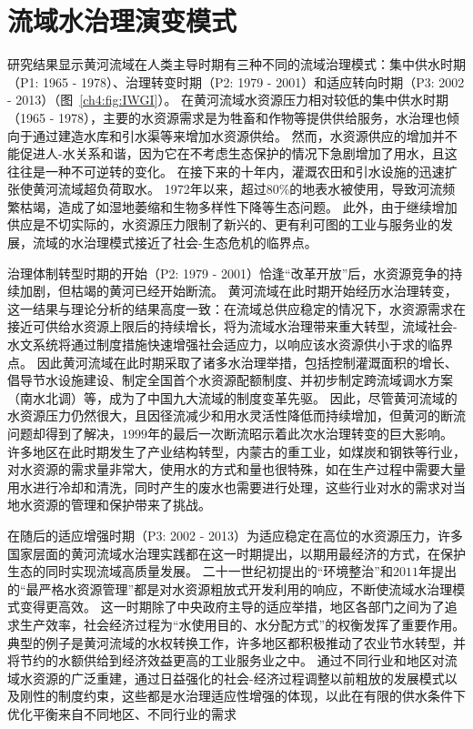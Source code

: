 \section{流域水治理演变模式}

研究结果显示黄河流域在人类主导时期有三种不同的流域治理模式：集中供水时期（P1: 1965 - 1978）、治理转变时期（P2: 1979 - 2001）和适应转向时期（P3: 2002 - 2013）（图~\ref{ch4:fig:IWGI}）。
在黄河流域水资源压力相对较低的集中供水时期（1965 - 1978），主要的水资源需求是为牲畜和作物等提供供给服务，水治理也倾向于通过建造水库和引水渠等来增加水资源供给。
然而，水资源供应的增加并不能促进人-水关系和谐，因为它在不考虑生态保护的情况下急剧增加了用水，且这往往是一种不可逆转的变化\cite{zhou2020}。
在接下来的十年内，灌溉农田和引水设施的迅速扩张使黄河流域超负荷取水。
1972年以来，超过$80\%$的地表水被使用，导致河流频繁枯竭，造成了如湿地萎缩和生物多样性下降等生态问题\cite{wang2019c, fu2021}。
此外，由于继续增加供应是不切实际的，水资源压力限制了新兴的、更有利可图的工业与服务业的发展，流域的水治理模式接近了社会-生态危机的临界点\cite{loch2020, wohlfart2016}。

治理体制转型时期的开始（P2: 1979 - 2001）恰逢“改革开放”后，水资源竞争的持续加剧，但枯竭的黄河已经开始断流。
黄河流域在此时期开始经历水治理转变，这一结果与理论分析的结果高度一致：在流域总供应稳定的情况下，水资源需求在接近可供给水资源上限后的持续增长，将为流域水治理带来重大转型，流域社会-水文系统将通过制度措施快速增强社会适应力，以响应该水资源供小于求的临界点\cite{loch2020}。
因此黄河流域在此时期采取了诸多水治理举措，包括控制灌溉面积的增长、倡导节水设施建设、制定全国首个水资源配额制度、并初步制定跨流域调水方案（南水北调）等\cite{wang2019b,long2020,nickum2021}，成为了中国九大流域的制度变革先驱。
因此，尽管黄河流域的水资源压力仍然很大，且因径流减少和用水灵活性降低而持续增加，但黄河的断流问题却得到了解决，$1999$年的最后一次断流昭示着此次水治理转变的巨大影响\cite{wang2019b}。
许多地区在此时期发生了产业结构转型，内蒙古的重工业，如煤炭和钢铁等行业，对水资源的需求量非常大，使用水的方式和量也很特殊，如在生产过程中需要大量用水进行冷却和清洗，同时产生的废水也需要进行处理，这些行业对水的需求对当地水资源的管理和保护带来了挑战。

在随后的适应增强时期（P3: 2002 - 2013）为适应稳定在高位的水资源压力，许多国家层面的黄河流域水治理实践都在这一时期提出，以期用最经济的方式，在保护生态的同时实现流域高质量发展。
二十一世纪初提出的“环境整治”和$2011$年提出的“最严格水资源管理”都是对水资源粗放式开发利用的响应，不断使流域水治理模式变得更高效。
这一时期除了中央政府主导的适应举措，地区各部门之间为了追求生产效率，社会经济过程为“水使用目的、水分配方式”的权衡发挥了重要作用。
典型的例子是黄河流域的水权转换工作，许多地区都积极推动了农业节水转型，并将节约的水额供给到经济效益更高的工业服务业之中。
通过不同行业和地区对流域水资源的广泛重建，通过日益强化的社会-经济过程调整以前粗放的发展模式以及刚性的制度约束，这些都是水治理适应性增强的体现，以此在有限的供水条件下优化平衡来自不同地区、不同行业的需求\cite{dalin2015,song2022}

